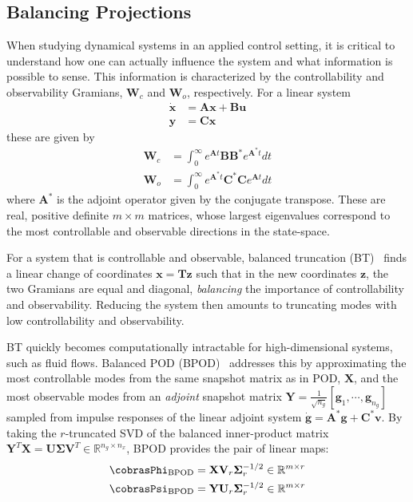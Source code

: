\documentclass[twocolumn,10pt]{article}
\begin{document}
\subsection{Balancing Projections}
When studying dynamical systems in an applied control setting, it is critical to understand how one can actually influence the system and what information is possible to sense. 
%
This information is characterized by the controllability and observability Gramians, $\mathbf W_c$ and $\mathbf W_o$, respectively. For a linear system 
\begin{subequations}
\begin{align}
    \dot{\mathbf x} &= \mathbf{Ax} + \mathbf{Bu}\\ 
    \mathbf y &= \mathbf{Cx}
\end{align} 
\end{subequations}
these are given by
%
\begin{subequations}
\begin{align}
    \mathbf W_c &= \int_0^\infty e^{\mathbf A t} \mathbf{BB^*}e^{\mathbf A^* t}dt
    \\
    \mathbf W_o &= \int_0^\infty e^{\mathbf A^* t} \mathbf{C^*C}e^{\mathbf A t}dt
\end{align}
\end{subequations}
where $\mathbf{A}^*$ is the adjoint operator given by the conjugate transpose. These are real, positive definite ${m\times m}$ matrices, whose largest eigenvalues correspond to the most controllable and observable directions in the state-space. 

For a system that is controllable and observable, balanced truncation (BT)~\cite{moore1981bt} finds a linear change of coordinates $\mathbf x = \mathbf{Tz}$ such that in the new coordinates $\mathbf z$, the two Gramians are equal and diagonal, \emph{balancing} the importance of controllability and observability. Reducing the system then amounts to truncating modes with low controllability and observability.   

BT quickly becomes computationally intractable for high-dimensional systems, such as fluid flows. Balanced POD (BPOD)~\cite{rowley2005model} addresses this by approximating the most controllable modes from the same snapshot matrix as in POD, $\mathbf X$, and the most observable modes from an \emph{adjoint} snapshot matrix $\mathbf Y = \frac{1}{\sqrt{n_g}}[\mathbf g_1, \cdots, \mathbf g_{n_g}]$ sampled from impulse responses of the linear adjoint system $\dot{\mathbf g} = \mathbf A^* \mathbf g + \mathbf C^*\mathbf v$. 
By taking the $r$-truncated SVD of the balanced inner-product matrix  $\mathbf Y^T\mathbf X = \mathbf U \mathbf \Sigma \mathbf V^T  \in \mathbb{R}^{n_g \times n_x}$, BPOD provides the pair of linear maps:
%
\begin{subequations}
\begin{align}
    \cobrasPhi_{\text{BPOD}} 
        &= \mathbf{X} \mathbf V_r \mathbf{\Sigma}_r^{-1/2}
    \in \mathbb{R}^{m \times r}
    \\
    \cobrasPsi_{\text{BPOD}} 
        &= \mathbf{Y} \mathbf U_r \mathbf{\Sigma}_r^{-1/2}
    \in \mathbb{R}^{m \times r}
\end{align}
\end{subequations}
\end{document}
